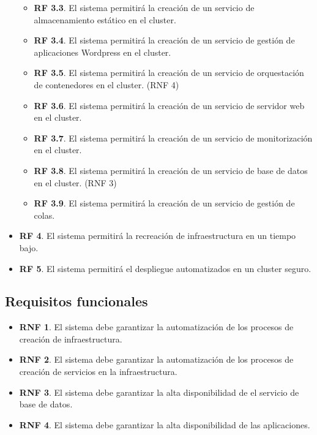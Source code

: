 \begin{itemize}
\begin{itemize}
                        \item \textbf{RF 3.3}. El sistema permitirá la creación de un servicio de almacenamiento estático en el cluster.
                        \item \textbf{RF 3.4}. El sistema permitirá la creación de un servicio de gestión de aplicaciones Wordpress en el cluster.
                        \item \textbf{RF 3.5}. El sistema permitirá la creación de un servicio de orquestación de contenedores en el cluster. (RNF 4)
                        \item \textbf{RF 3.6}. El sistema permitirá la creación de un servicio de servidor web en el cluster.
                        \item \textbf{RF 3.7}. El sistema permitirá la creación de un servicio de monitorización en el cluster.
                        \item \textbf{RF 3.8}. El sistema permitirá la creación de un servicio de base de datos en el cluster. (RNF 3)
                        \item \textbf{RF 3.9}. El sistema permitirá la creación de un servicio de gestión de colas.
                \end{itemize}

        \item \textbf{RF 4}. El sistema permitirá la recreación de infraestructura en un tiempo bajo.

        \item \textbf{RF 5}. El sistema permitirá el despliegue automatizados en un cluster seguro.
        \end{itemize}

        \subsection{Requisitos funcionales}
        \begin{itemize}
                \item \textbf{RNF 1}. El sistema debe garantizar la automatización de los procesos de creación de infraestructura.
                \item \textbf{RNF 2}. El sistema debe garantizar la automatización de los procesos de creación de servicios en la infraestructura.
                \item \textbf{RNF 3}. El sistema debe garantizar la alta disponibilidad de el servicio de base de datos.
                \item \textbf{RNF 4}. El sistema debe garantizar la alta disponibilidad de las aplicaciones.
        \end{itemize}

